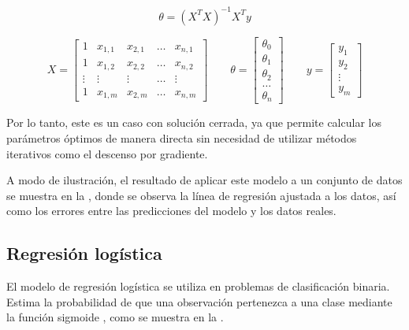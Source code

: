 \begin{equation}
    \label{eq:ols}
        \theta = \left(X^T X\right)^{-1} X^T y
\end{equation}

\begin{equation}
    \label{eq:ols_matrices}
      X =
        \begin{bmatrix}
        1 & x_{1,1} & x_{2,1} & \dots & x_{n,1} \\
        1 & x_{1,2} & x_{2,2} & \dots & x_{n,2} \\
        \vdots & \vdots & \vdots & \dots & \vdots \\
        1 & x_{1,m} & x_{2,m} & \dots & x_{n,m}
        \end{bmatrix}
      \quad \quad
      \theta =
        \begin{bmatrix}
          \theta_0 \\ \theta_1 \\ \theta_2 \\ \dots \\ \theta_n
        \end{bmatrix}
      \quad \quad
      y = \begin{bmatrix} y_1 \\ y_2 \\ \vdots \\ y_m \end{bmatrix}
    \end{equation}


Por lo tanto, este es un caso con solución cerrada, ya que permite calcular los parámetros óptimos de manera directa sin necesidad de utilizar métodos iterativos como el descenso por gradiente.

A modo de ilustración, el resultado de aplicar este modelo a un conjunto de datos se muestra en la , donde se observa la línea de regresión ajustada a los datos, así como los errores entre las predicciones del modelo y los datos reales.


\subsection{Regresión logística}
\label{sec:regresion_logistica}

El modelo de regresión logística se utiliza en problemas de clasificación binaria. Estima la probabilidad de que una observación pertenezca a una clase mediante la función sigmoide \cite{Hosmer2013}, como se muestra en la .


